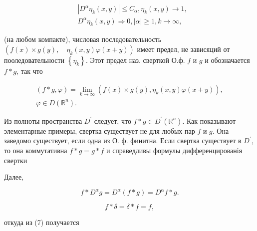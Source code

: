 \documentclass[10pt]{article}
\begin{document}
\[

\begin{aligned}

& \left|D^{\alpha} \eta_{k}(x, y)\right| \leqslant C_{\alpha}, \eta_{k}(x, y) \rightarrow 1, \\

& D^{\alpha} \eta_{k}(x, y) \Rightarrow 0,|\alpha| \geqslant 1, k \rightarrow \infty,

\end{aligned}

\]



(на любом компакте), числовая последовательность $\left(f(x) \times g(y), \quad \eta_{k}(x, y) \varphi(x+y)\right)$ имеет предел, не зависяций от пооледовательности $\left\{\eta_{k}\right\}$. Этот предел наз. сверткой О.ф. $f$ и $g$ и обозначается $f * g$, так что



\[

\begin{gathered}

(f * g, \varphi)=\lim _{k \rightarrow \infty}\left(f(x) \times g(y), \eta_{k}(x, y) \varphi(x+y)\right), \\

\varphi \in D\left(\mathbb{R}^{n}\right) .

\end{gathered}

\]



Из полноты пространства $D^{\prime}$ следует, что $f * g \in D^{\prime}\left(\mathbb{R}^{n}\right)$. Как показывают элементарные примеры, свертка существует не для любых пар $f$ и $g$. Она заведомо существует, если одна из О. ф. финитна. Если свертка существует в $D^{\prime}$, то она коммутативна $f * g=g * f$ и справедливы формулы дифференцированія свертки



Далее,



\[

f * D^{\alpha} g=D^{\alpha}(f * g)=D^{\alpha} f * g .

\]



\[

f * \delta=\delta * f=f,

\]



откуда из (7) получается
\end{document}
